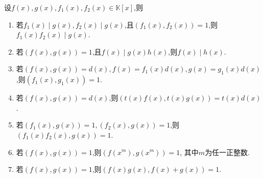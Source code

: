 \documentclass[../../main.tex]{subfiles}
\begin{document}
\begin{proposition}[互素多项式和最大公因式的基本性质]\label{proposition:互素多项式和最大公因式的基本性质}
设$f(x),g(x),f_1(x),f_2(x)\in \mathbb{K}[x]$,则
\begin{enumerate}[(1)]
\item 若\(f_1(x)\mid g(x), f_2(x)\mid g(x)\),且\((f_1(x), f_2(x)) = 1\),则\(f_1(x)f_2(x)\mid g(x)\).
\item  若\((f(x), g(x)) = 1\),且\(f(x)\mid g(x)h(x)\),则\(f(x)\mid h(x)\).
\item  若\((f(x), g(x)) = d(x), f(x)=f_1(x)d(x), g(x)=g_1(x)d(x)\),则\((f_1(x), g_1(x)) = 1\).
\item  若\((f(x), g(x)) = d(x)\),则\((t(x)f(x), t(x)g(x)) = t(x)d(x)\).
\item  若\((f_1(x), g(x)) = 1, (f_2(x), g(x)) = 1\),则\((f_1(x)f_2(x), g(x)) = 1\).

\item 若\((f(x),g(x))=1\),则\((f(x^m),g(x^m))=1\), 其中\(m\)为任一正整数.

\item  若\((f(x),g(x)) = 1\),则\((f(x)g(x),f(x)+g(x)) = 1\).
\end{enumerate}
\end{proposition}
\end{document}
